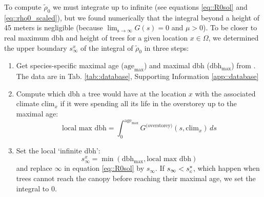 To compute $ \tilde \rho_0 $ we must integrate up to infinite (see equations \eqref{eq::R0sol} and \eqref{eq::rho0_scaled}), but we found numerically that the integral beyond a height of 45 meters is negligible (because $ \lim_{\text{s} \to \infty} G(s) = 0 $ and $ \mu > 0 $). To be closer to real maximum dbh and height of trees for a given location $ x \in \Omega $, we determined the upper boundary $ s_{\infty}^{x} $ of the integral of $ \tilde \rho_0 $ in three steps:
\begin{enumerate}
	\item Get species-specific maximal age ($ \text{age}_{\max} $) and maximal dbh ($ \text{dbh}_{\max} $) from \citet{Burns1990, Burns1990a}. The data are in Tab. \ref{tab::database}, Supporting Information \ref{app::database}
	\item Compute which dbh a tree would have at the location $ x $ with the associated climate $ \text{clim}_x $ if it were spending all its life in the overstorey up to the maximal age:
	\[
		\text{local max dbh} = \int_0^{\text{age}_{\max}} G^{\text{(overstorey)}}(s, \text{clim}_x) \, ds
	\]
	\item Set the local `infinite dbh':
	\begin{equation} \label{eq::s_inf}
		s_{\infty}^{x} = \min(\text{dbh}_{\max}, \text{local max dbh})
	\end{equation}
	and replace $ \infty $ in equation \eqref{eq::R0sol} by $ s_{\infty} $. If $ s_{\infty} < {s}^{*}_c $, which happen when trees cannot reach the canopy before reaching their maximal age, we set the integral to 0.
\end{enumerate}
